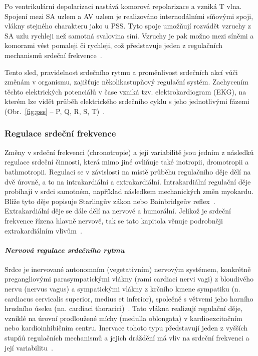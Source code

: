 Po ventrikulární depolarizaci nastává komorová repolarizace a vzniká T vlna.
Spojení mezi SA uzlem a AV uzlem je realizováno internodálními síňovými spoji,
vlákny stejného charakteru jako u PSS. Tyto spoje umožňují rozvádět vzruchy z SA
uzlu rychleji než samotná svalovina síní. Vzruchy je pak možno mezi síněmi a
komorami vést pomaleji či rychleji, což představuje jeden z regulačních
mechanismů srdeční frekvence~\cite{Dylevsky2013,Cihak2016}.

Tento sled, pravidelnost srdečního rytmu a proměnlivost srdečních akcí vůči
změnám v organismu, zajišťuje několikastupňový regulační systém. Zachycením
těchto elektrických potenciálů v čase vzniká tzv. elektrokardiogram (EKG), na
kterém lze vidět průběh elektrického srdečního cyklu s jeho jednotlivými fázemi
(Obr.~\ref{fig:pss} -- P, Q, R, S, T)~\cite{Dylevsky2013,Cihak2016}.


\subsubsection{Regulace srdeční frekvence}
\label{section:hr_regulation}
Změny v srdeční frekvenci (chronotropie) a její variabilitě jsou jedním z
následků regulace srdeční činnosti, která mimo jiné ovliňuje také inotropii,
dromotropii a bathmotropii. Regulaci se v závislosti na místě průběhu
regulačního děje dělí na dvě úrovně, a to na intrakardiální a extrakardiální.
Intrakardiální regulační děje probíhají v srdci samotném, například následkem
mechanických změn myokardu. Blíže tyto děje popisuje Starlingův zákon nebo
Bainbridgeův reflex~\cite{Kittnar2020}. Extrakardiální děje se dále dělí na
nervové a humorální. Jelikož je srdeční frekvence řízena hlavně nervově, tak se
tato kapitola věnuje podrobněji extrakardiálním vlivům~\cite{Orel2019}.

\paragraph*{\textit{Nervová regulace srdečního rytmu}\\} Srdce je inervované
autonomním (vegetativním) nervovým systémem, konkrétně pregangliovými
parasympatickými vlákny (rami cardiaci nervi vagi) z bloudivého nervu (nervus
vagus) a sympatickými vlákny z krčního kmene sympatiku (n. cardiacus cervicalis
superior, medius et inferior), společně s větvemi jeho horního hrudního úseku
(nn. cardiaci thoracici)~\cite{Dylevsky2013,Kittnar2020}. Tato vlákna realizují
regulační děje, vzniklé na úrovní prodloužené míchy (medulla oblongata) v
kardioexcitačním nebo kardioinhibičním centru. Inervace tohoto typu představují
jeden z vyšších stupňů regulačních mechanismů a jejich dráždění má vliv na
srdeční frekvenci a její variabilitu~\cite{Dylevsky2013,Trojan2002}.

